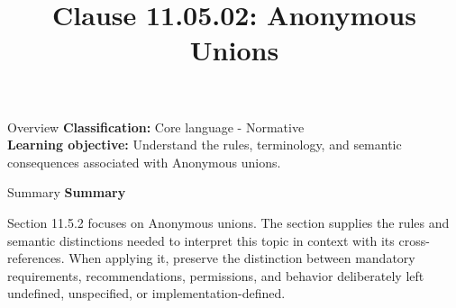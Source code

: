 \documentclass[10pt,letterpaper]{article}
\title{Clause 11.05.02: Anonymous Unions}
\author{}
\date{}
\begin{document}
\maketitle
\begin{CornellOverviewBox}{Overview}
\textbf{Classification:} Core language - Normative\\[2pt]
\textbf{Learning objective:} Understand the rules, terminology, and semantic consequences associated with Anonymous unions.
\end{CornellOverviewBox}\begin{CornellSummaryBox}{Summary}
{\sffamily\bfseries\color{Accent} Summary}\par\vspace{3pt}Section 11.5.2 focuses on Anonymous unions. The section supplies the rules and semantic distinctions needed to interpret this topic in context with its cross-references. When applying it, preserve the distinction between mandatory requirements, recommendations, permissions, and behavior deliberately left undefined, unspecified, or implementation-defined.
\end{CornellSummaryBox}
\end{document}

